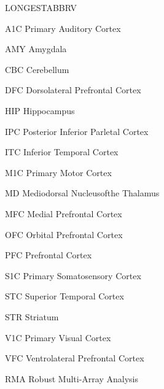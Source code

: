 \begin{theglossary}{LONGESTABBRV}

\item[A1C] Primary Auditory Cortex
\item[AMY] Amygdala
\item[CBC] Cerebellum
\item[DFC] Dorsolateral Prefrontal Cortex
\item[HIP] Hippocampus
\item[IPC] Posterior Inferior Parletal Cortex
\item[ITC] Inferior Temporal Cortex
\item[M1C] Primary Motor Cortex
\item[MD] Mediodorsal Nucleusofthe Thalamus
\item[MFC] Medial Prefrontal Cortex
\item[OFC] Orbital Prefrontal Cortex
\item[PFC] Prefrontal Cortex
\item[S1C] Primary Somatosensory Cortex
\item[STC] Superior Temporal Cortex
\item[STR] Striatum
\item[V1C] Primary Visual Cortex
\item[VFC] Ventrolateral Prefrontal Cortex
\item[RMA] Robust Multi-Array Analysis 

\end{theglossary}
